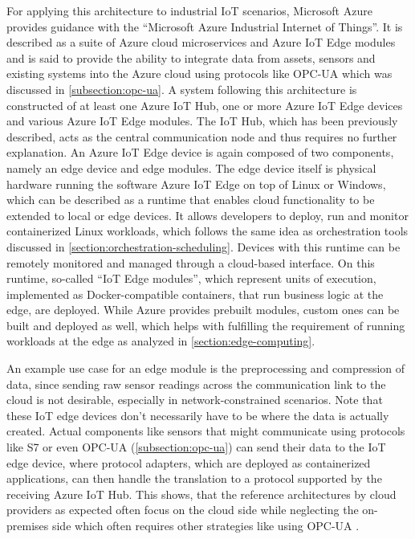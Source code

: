     For applying this architecture to industrial IoT scenarios, Microsoft Azure provides guidance with the ``Microsoft Azure Industrial Internet of Things''. It is described as a suite of Azure cloud microservices and Azure IoT Edge modules and is said to provide the ability to integrate data from assets, sensors and existing systems into the Azure cloud using protocols like OPC-UA which was discussed in \autoref{subsection:opc-ua}. A system following this architecture is constructed of at least one Azure IoT Hub, one or more Azure IoT Edge devices and various Azure IoT Edge modules. The IoT Hub, which has been previously described, acts as the central communication node and thus requires no further explanation. An Azure IoT Edge device is again composed of two components, namely an edge device and edge modules. The edge device itself is physical hardware running the software Azure IoT Edge on top of Linux or Windows, which can be described as a runtime that enables cloud functionality to be extended to local or edge devices. It allows developers to deploy, run and monitor containerized Linux workloads, which follows the same idea as orchestration tools discussed in \autoref{section:orchestration-scheduling}. Devices with this runtime can be remotely monitored and managed through a cloud-based interface. On this runtime, so-called ``IoT Edge modules'', which represent units of execution, implemented as Docker-compatible containers, that run business logic at the edge, are deployed. While Azure provides prebuilt modules, custom ones can be built and deployed as well, which helps with fulfilling the requirement of running workloads at the edge as analyzed in \autoref{section:edge-computing}. 
    
    An example use case for an edge module is the preprocessing and compression of data, since sending raw sensor readings across the communication link to the cloud is not desirable, especially in network-constrained scenarios. Note that these IoT edge devices don't necessarily have to be where the data is actually created. Actual components like sensors that might communicate using protocols like S7 or even OPC-UA (\autoref{subsection:opc-ua}) can send their data to the IoT edge device, where protocol adapters, which are deployed as containerized applications, can then handle the translation to a protocol supported by the receiving Azure IoT Hub. This shows, that the reference architectures by cloud providers as expected often focus on the cloud side while neglecting the on-premises side which often requires other strategies like using OPC-UA \cite{microsoft_azure_iot_reference} \cite{iot_edge_docs} \cite{azure_iiot_overview}.


